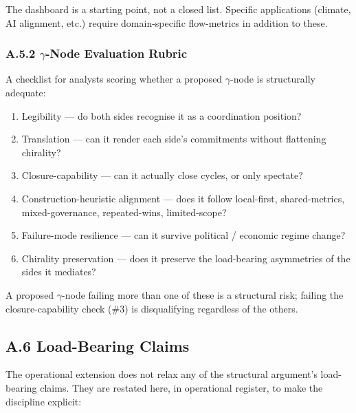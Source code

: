 \documentclass[
]{article}
\providecommand{\tightlist}{%
  \setlength{\itemsep}{0pt}\setlength{\parskip}{0pt}}
\begin{document}
The dashboard is a starting point, not a closed list. Specific
applications (climate, AI alignment, etc.) require domain-specific
flow-metrics in addition to these.

\subsubsection*{A.5.2 \(\gamma\)-Node Evaluation Rubric}

A checklist for analysts scoring whether a proposed \(\gamma\)-node is
structurally adequate:

\begin{enumerate}
\def\labelenumi{\arabic{enumi}.}
\tightlist
\item
  Legibility --- do both sides recognise it as a coordination position?
\item
  Translation --- can it render each side's commitments without
  flattening chirality?
\item
  Closure-capability --- can it actually close cycles, or only
  spectate?
\item
  Construction-heuristic alignment --- does it follow local-first,
  shared-metrics, mixed-governance, repeated-wins, limited-scope?
\item
  Failure-mode resilience --- can it survive political / economic
  regime change?
\item
  Chirality preservation --- does it preserve the load-bearing
  asymmetries of the sides it mediates?
\end{enumerate}

A proposed \(\gamma\)-node failing more than one of these is a
structural risk; failing the closure-capability check (\#3) is
disqualifying regardless of the others.

\subsection{A.6 Load-Bearing
Claims}\label{appendix-a-load-bearing-claims}

The operational extension does not relax any of the structural
argument's load-bearing claims. They are restated here, in operational
register, to make the discipline explicit:
\end{document}
